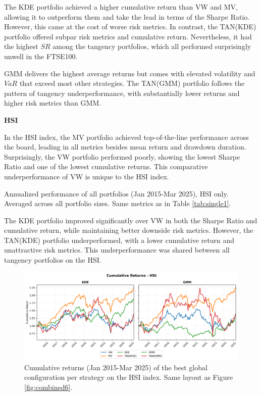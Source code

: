 The KDE portfolio achieved a higher cumulative return than VW and MV, allowing it to outperform them and take the lead in terms of the Sharpe Ratio. However, this came at the cost of worse risk metrics. In contrast, the TAN(KDE) portfolio offered subpar risk metrics and cumulative return. Nevertheless, it had the highest $SR$ among the tangency portfolios, which all performed surprisingly unwell in the FTSE100.

GMM delivers the highest average returns but comes with elevated volatility and $VaR$ that exceed most other strategies. The TAN(GMM) portfolio follows the pattern of tangency underperformance, with substantially lower returns and higher risk metrics than GMM.

\begin{center}
  \textbf{HSI}
\end{center}
In the HSI index, the MV portfolio achieved top-of-the-line performance across the board, leading in all metrics besides mean return and drawdown duration. Surprisingly, the VW portfolio performed poorly, showing the lowest Sharpe Ratio and one of the lowest cumulative returns. This comparative underperformance of VW is unique to the HSI index.

\begin{table}[H]
  \centering
  
  \caption[Global best configuration - All strategies - HSI]{Annualized performance of all portfolios (Jan 2015-Mar 2025), HSI only. Averaged across all portfolio sizes. Same metrics as in Table \ref{tab:single1}.}
  \label{tab:single6}
\end{table}

The KDE portfolio improved significantly over VW in both the Sharpe Ratio and cumulative return, while maintaining better downside risk metrics. However, the TAN(KDE) portfolio underperformed, with a lower cumulative return and unattractive risk metrics. This underperformance was shared between all tangency portfolios on the HSI.

\vspace{5mm}
\begin{figure}[H]
  \begin{center}
  \begin{minipage}{1\textwidth}
    \centering
    \includegraphics[width=\textwidth]{images/40_7.png}
  \end{minipage}
  \caption[Global best configuration - HSI - Cumulative returns]{Cumulative returns (Jan 2015-Mar 2025) of the best global configuration per strategy on the HSI index. Same layout as Figure \ref{fig:combined6}.}
  \label{fig:combined7}
  \end{center}
  \end{figure}

